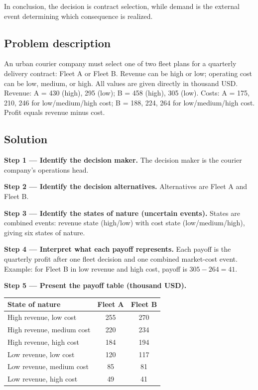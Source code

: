\begin{ExamProblems}
		In conclusion, the decision is contract selection, while demand is the external event determining which consequence is realized.
		
		\item
		\subsection*{Problem description}
		An urban courier company must select one of two fleet plans for a quarterly delivery contract:
		Fleet A or Fleet B.
		Revenue can be high or low; operating cost can be low, medium, or high.
		All values are given directly in thousand USD.
		Revenue: A = 430 (high), 295 (low); B = 458 (high), 305 (low).
		Costs: A = 175, 210, 246 for low/medium/high cost;
		B = 188, 224, 264 for low/medium/high cost.
		Profit equals revenue minus cost.
		
		\subsection*{Solution}
		\textbf{Step 1 --- Identify the decision maker.} The decision maker is the courier company's operations head.
		
		\textbf{Step 2 --- Identify the decision alternatives.} Alternatives are Fleet A and Fleet B.
		
		\textbf{Step 3 --- Identify the states of nature (uncertain events).} States are combined events: revenue state (high/low) with cost state (low/medium/high), giving six states of nature.
		
		\textbf{Step 4 --- Interpret what each payoff represents.} Each payoff is the quarterly profit after one fleet decision and one combined market-cost event. Example: for Fleet B in low revenue and high cost, payoff is \(305-264=41\).
		
		\textbf{Step 5 --- Present the payoff table (thousand USD).}
		\begin{center}
			\begin{tabular}{l c c}
				\toprule
				State of nature & Fleet A & Fleet B \\
				\midrule
				High revenue, low cost & 255 & 270 \\
				High revenue, medium cost & 220 & 234 \\
				High revenue, high cost & 184 & 194 \\
				Low revenue, low cost & 120 & 117 \\
				Low revenue, medium cost & 85 & 81 \\
				Low revenue, high cost & 49 & 41 \\
				\bottomrule
			\end{tabular}
		\end{center}
		

\end{ExamProblems}
